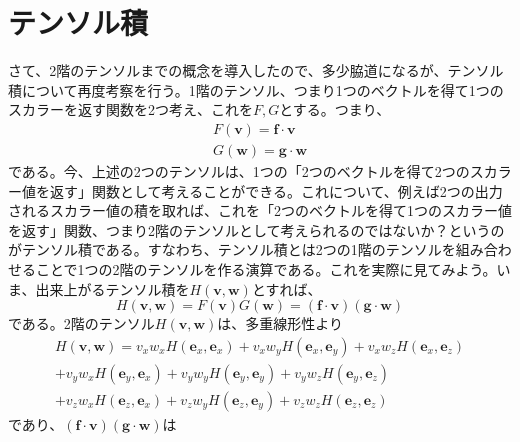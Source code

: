 \section{テンソル積}
\label{sec:tensor_product}さて、2階のテンソルまでの概念を導入したので、多少脇道になるが、テンソル積について再度考察を行う。1階のテンソル、つまり1つのベクトルを得て1つのスカラーを返す関数を2つ考え、これを\(F,G\)とする。つまり、
\begin{equation}
	\begin{aligned}
		F(\boldsymbol{v}) =\boldsymbol{f}\cdot\boldsymbol{v} \\
		G(\boldsymbol{w}) =\boldsymbol{g}\cdot\boldsymbol{w}
	\end{aligned}
\end{equation}
である。今、上述の2つのテンソルは、1つの「2つのベクトルを得て2つのスカラー値を返す」関数として考えることができる。これについて、例えば2つの出力されるスカラー値の積を取れば、これを「2つのベクトルを得て1つのスカラー値を返す」関数、つまり2階のテンソルとして考えられるのではないか？というのがテンソル積である。すなわち、テンソル積とは2つの1階のテンソルを組み合わせることで1つの2階のテンソルを作る演算である。これを実際に見てみよう。いま、出来上がるテンソル積を\(H(\boldsymbol{v},\boldsymbol{w})\)とすれば、
\begin{equation}
	H(\boldsymbol{v},\boldsymbol{w})=F(\boldsymbol{v}) G(\boldsymbol{w}) =(\boldsymbol{f}\cdot\boldsymbol{v})(\boldsymbol{g}\cdot\boldsymbol{w})
\end{equation}
である。2階のテンソル\(H(\boldsymbol{v},\boldsymbol{w})\)は、多重線形性より
\begin{equation}
	\begin{aligned}
		H(\boldsymbol{v},\boldsymbol{w}) =v_x w_xH(\boldsymbol{e}_x,\boldsymbol{e}_x) + v_x w_yH(\boldsymbol{e}_x,\boldsymbol{e}_y) +v_x w_zH(\boldsymbol{e}_x,\boldsymbol{e}_z) \\
		+v_y w_xH(\boldsymbol{e}_y,\boldsymbol{e}_x) + v_y w_yH(\boldsymbol{e}_y,\boldsymbol{e}_y) +v_y w_zH(\boldsymbol{e}_y,\boldsymbol{e}_z)                                  \\
		+v_z w_xH(\boldsymbol{e}_z,\boldsymbol{e}_x) + v_z w_yH(\boldsymbol{e}_z,\boldsymbol{e}_y) +v_z w_zH(\boldsymbol{e}_z,\boldsymbol{e}_z)
	\end{aligned}
\end{equation}
であり、\((\boldsymbol{f}\cdot\boldsymbol{v})(\boldsymbol{g}\cdot\boldsymbol{w})\)は

